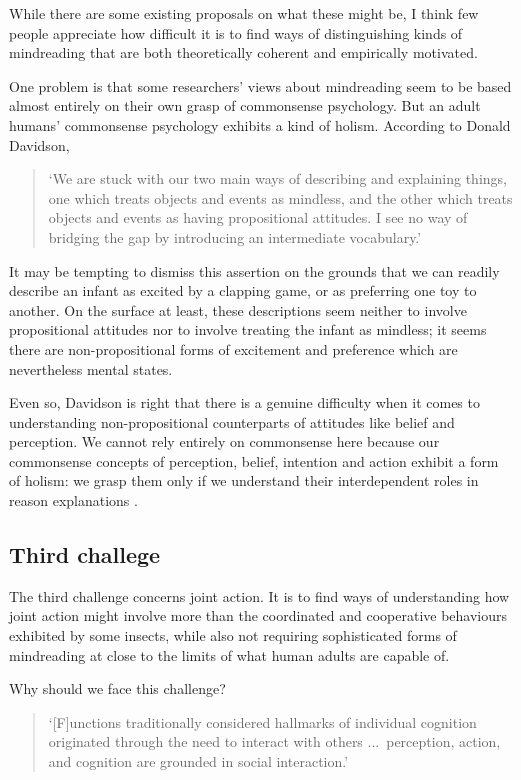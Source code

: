 \documentclass[12pt,\papersize]{extarticle}
\begin{document}
While there are some existing proposals on what these might be, I think few people appreciate how difficult it is to find ways of distinguishing kinds of mindreading that are both theoretically coherent and empirically motivated.

One problem is that some researchers' views about mindreading seem to be based almost entirely on their own grasp of commonsense psychology.  
But an adult humans' commonsense psychology exhibits a kind of holism.
According to Donald Davidson,
%
\begin{quote}
`We are stuck with our two main ways of describing and explaining things, one which treats objects and events as mindless, and the other which treats objects and events as having propositional attitudes. I see no way of bridging the gap by introducing an intermediate vocabulary.' \citep[p.\ 697]{Davidson:2003bw}
\end{quote}
%
It may be tempting to dismiss this assertion on the grounds that we can readily describe an infant as excited by a clapping game, or as preferring one toy to another. 
On the surface at least, these descriptions seem neither to involve propositional attitudes nor to involve treating the infant as mindless; it seems there are non-propositional forms of excitement and preference which are nevertheless mental states.

Even so, Davidson is right that there is a genuine difficulty when it comes to understanding non-propositional counterparts of attitudes like belief and perception.  We cannot rely entirely on commonsense here because our commonsense concepts of perception, belief, intention and action exhibit a form of holism: we grasp them only if we understand their interdependent roles in reason explanations \citep{Davidson:1995lk,Davidson:1995nl}. 


\subsection{Third challege}
The third challenge concerns joint action.
It is to find ways of understanding how joint action might involve more than the coordinated and cooperative behaviours exhibited by some insects, while also not requiring sophisticated forms of mindreading at close to the limits of what human adults are capable of.

Why should we face this challenge?

\begin{quote}
`[F]unctions traditionally considered hallmarks of individual cognition originated through the need to interact with others ...\
perception, action, and cognition are grounded in social interaction.'\citep[p.\ 103]{Knoblich:2006bn}
\end{quote}
\end{document}
